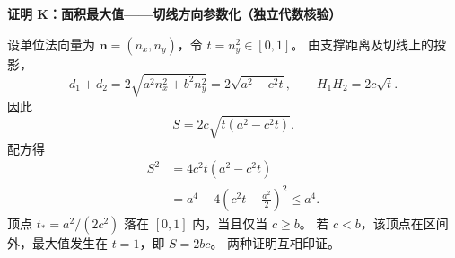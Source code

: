 \begin{proofbox}
\textbf{证明 K：面积最大值——切线方向参数化（独立代数核验）}

设单位法向量为 $\boldsymbol n=(n_x,n_y)$，令 $t=n_y^2\in[0,1]$。
由支撑距离及切线上的投影，
\[
d_1+d_2=2\sqrt{a^2n_x^2+b^2n_y^2}
=2\sqrt{a^2-c^2t},
\qquad H_1H_2=2c\sqrt t.
\]
因此
\[
\boxed{S=2c\sqrt{t(a^2-c^2t)}}.
\]
配方得
\[
\begin{aligned}
S^2
&=4c^2t(a^2-c^2t)\\
&=a^4-4\left(c^2t-\frac{a^2}{2}\right)^2
\le a^4.
\end{aligned}
\]
顶点 $t_*=a^2/(2c^2)$ 落在 $[0,1]$ 内，当且仅当 $c\ge b$。
若 $c<b$，该顶点在区间外，最大值发生在 $t=1$，即 $S=2bc$。
两种证明互相印证。
\end{proofbox}
